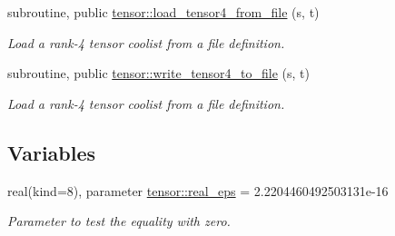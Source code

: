 \begin{DoxyCompactItemize}
subroutine, public \hyperlink{namespacetensor_a373dab2b483b4bc5f521934660d289aa}{tensor\+::load\+\_\+tensor4\+\_\+from\+\_\+file} (s, t)
\begin{DoxyCompactList}\small\item\em Load a rank-\/4 tensor coolist from a file definition. \end{DoxyCompactList}\item 
subroutine, public \hyperlink{namespacetensor_a328cec7eb0ae3c472db0f9ccdd475763}{tensor\+::write\+\_\+tensor4\+\_\+to\+\_\+file} (s, t)
\begin{DoxyCompactList}\small\item\em Load a rank-\/4 tensor coolist from a file definition. \end{DoxyCompactList}\end{DoxyCompactItemize}
\subsection*{Variables}
\begin{DoxyCompactItemize}
\item 
real(kind=8), parameter \hyperlink{namespacetensor_a2a2ab182d86107e62533c3f0043652cc}{tensor\+::real\+\_\+eps} = 2.\+2204460492503131e-\/16
\begin{DoxyCompactList}\small\item\em Parameter to test the equality with zero. \end{DoxyCompactList}\end{DoxyCompactItemize}
